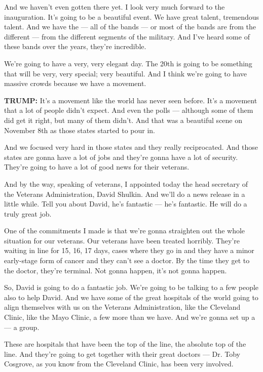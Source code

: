 And we haven't even gotten there yet. I look very much forward to the
inauguration. It's going to be a beautiful event. We have great talent,
tremendous talent. And we have the --- all of the bands --- or most of
the bands are from the different --- from the different segments of the
military. And I've heard some of these bands over the years, they're
incredible.

We're going to have a very, very elegant day. The 20th is going to be
something that will be very, very special; very beautiful. And I think
we're going to have massive crowds because we have a movement.

\textbf{TRUMP:} It's a movement like the world has never seen before.
It's a movement that a lot of people didn't expect. And even the polls
--- although some of them did get it right, but many of them didn't. And
that was a beautiful scene on November 8th as those states started to
pour in.

And we focused very hard in those states and they really reciprocated.
And those states are gonna have a lot of jobs and they're gonna have a
lot of security. They're going to have a lot of good news for their
veterans.

And by the way, speaking of veterans, I appointed today the head
secretary of the Veterans Administration, David Shulkin. And we'll do a
news release in a little while. Tell you about David, he's fantastic ---
he's fantastic. He will do a truly great job.

One of the commitments I made is that we're gonna straighten out the
whole situation for our veterans. Our veterans have been treated
horribly. They're waiting in line for 15, 16, 17 days, cases where they
go in and they have a minor early-stage form of cancer and they can't
see a doctor. By the time they get to the doctor, they're terminal. Not
gonna happen, it's not gonna happen.

So, David is going to do a fantastic job. We're going to be talking to a
few people also to help David. And we have some of the great hospitals
of the world going to align themselves with us on the Veterans
Administration, like the Cleveland Clinic, like the Mayo Clinic, a few
more than we have. And we're gonna set up a --- a group.

These are hospitals that have been the top of the line, the absolute top
of the line. And they're going to get together with their great doctors
--- Dr. Toby Cosgrove, as you know from the Cleveland Clinic, has been
very involved.

